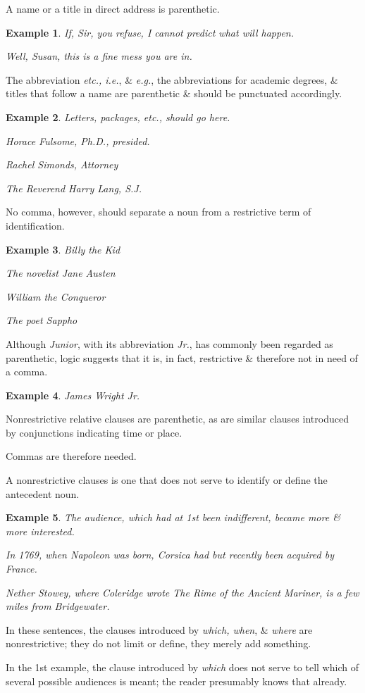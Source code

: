 \documentclass{article}
\newtheorem{example}{Example}
\begin{document}
%
A name or a title in direct address is parenthetic.
\begin{example}
	If, Sir, you refuse, I cannot predict what will happen.
	
	Well, Susan, this is a fine mess you are in.
\end{example}
The abbreviation {\it etc., i.e.}, \& {\it e.g.}, the abbreviations for academic degrees, \& titles that follow a name are parenthetic \& should be punctuated accordingly.
\begin{example}
	Letters, packages, etc., should go here.
	
	Horace Fulsome, Ph.D., presided.
	
	Rachel Simonds, Attorney
	
	The Reverend Harry Lang, S.J.
\end{example}
No comma, however, should separate a noun from a restrictive term of identification.
\begin{example}
	Billy the Kid
	
	The novelist Jane Austen
	
	William the Conqueror
	
	The poet Sappho
\end{example}
Although {\it Junior}, with its abbreviation {\it Jr.}, has commonly been regarded as parenthetic, logic suggests that it is, in fact, restrictive \& therefore not in need of a comma.
\begin{example}
	James Wright Jr.
\end{example}
Nonrestrictive relative clauses are parenthetic, as are similar clauses introduced by conjunctions indicating time or place.

Commas are therefore needed.

A nonrestrictive clauses is one that does not serve to identify or define the antecedent noun.
\begin{example}
	The audience, which had at 1st been indifferent, became more \& more interested.
	
	In 1769, when Napoleon was born, Corsica had but recently been acquired by France.
	
	Nether Stowey, where Coleridge wrote The Rime of the Ancient Mariner, is a few miles from Bridgewater.
\end{example}
In these sentences, the clauses introduced by {\it which, when}, \& {\it where} are nonrestrictive; they do not limit or define, they merely add something.

In the 1st example, the clause introduced by {\it which} does not serve to tell which of several possible audiences is meant; the reader presumably knows that already.
\end{document}
